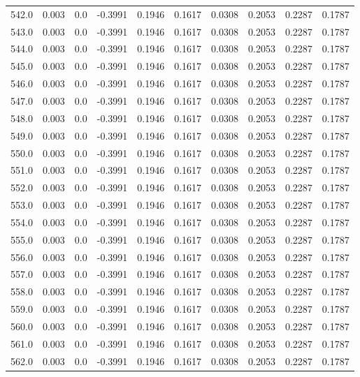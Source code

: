 \begin{longtable}{lrrrrrrrrr}
542.0 & 0.003 & 0.0 & -0.3991 & 0.1946 & 0.1617 & 0.0308 & 0.2053 & 0.2287 & 0.1787 \\
543.0 & 0.003 & 0.0 & -0.3991 & 0.1946 & 0.1617 & 0.0308 & 0.2053 & 0.2287 & 0.1787 \\
544.0 & 0.003 & 0.0 & -0.3991 & 0.1946 & 0.1617 & 0.0308 & 0.2053 & 0.2287 & 0.1787 \\
545.0 & 0.003 & 0.0 & -0.3991 & 0.1946 & 0.1617 & 0.0308 & 0.2053 & 0.2287 & 0.1787 \\
546.0 & 0.003 & 0.0 & -0.3991 & 0.1946 & 0.1617 & 0.0308 & 0.2053 & 0.2287 & 0.1787 \\
547.0 & 0.003 & 0.0 & -0.3991 & 0.1946 & 0.1617 & 0.0308 & 0.2053 & 0.2287 & 0.1787 \\
548.0 & 0.003 & 0.0 & -0.3991 & 0.1946 & 0.1617 & 0.0308 & 0.2053 & 0.2287 & 0.1787 \\
549.0 & 0.003 & 0.0 & -0.3991 & 0.1946 & 0.1617 & 0.0308 & 0.2053 & 0.2287 & 0.1787 \\
550.0 & 0.003 & 0.0 & -0.3991 & 0.1946 & 0.1617 & 0.0308 & 0.2053 & 0.2287 & 0.1787 \\
551.0 & 0.003 & 0.0 & -0.3991 & 0.1946 & 0.1617 & 0.0308 & 0.2053 & 0.2287 & 0.1787 \\
552.0 & 0.003 & 0.0 & -0.3991 & 0.1946 & 0.1617 & 0.0308 & 0.2053 & 0.2287 & 0.1787 \\
553.0 & 0.003 & 0.0 & -0.3991 & 0.1946 & 0.1617 & 0.0308 & 0.2053 & 0.2287 & 0.1787 \\
554.0 & 0.003 & 0.0 & -0.3991 & 0.1946 & 0.1617 & 0.0308 & 0.2053 & 0.2287 & 0.1787 \\
555.0 & 0.003 & 0.0 & -0.3991 & 0.1946 & 0.1617 & 0.0308 & 0.2053 & 0.2287 & 0.1787 \\
556.0 & 0.003 & 0.0 & -0.3991 & 0.1946 & 0.1617 & 0.0308 & 0.2053 & 0.2287 & 0.1787 \\
557.0 & 0.003 & 0.0 & -0.3991 & 0.1946 & 0.1617 & 0.0308 & 0.2053 & 0.2287 & 0.1787 \\
558.0 & 0.003 & 0.0 & -0.3991 & 0.1946 & 0.1617 & 0.0308 & 0.2053 & 0.2287 & 0.1787 \\
559.0 & 0.003 & 0.0 & -0.3991 & 0.1946 & 0.1617 & 0.0308 & 0.2053 & 0.2287 & 0.1787 \\
560.0 & 0.003 & 0.0 & -0.3991 & 0.1946 & 0.1617 & 0.0308 & 0.2053 & 0.2287 & 0.1787 \\
561.0 & 0.003 & 0.0 & -0.3991 & 0.1946 & 0.1617 & 0.0308 & 0.2053 & 0.2287 & 0.1787 \\
562.0 & 0.003 & 0.0 & -0.3991 & 0.1946 & 0.1617 & 0.0308 & 0.2053 & 0.2287 & 0.1787 \\

\end{longtable}
